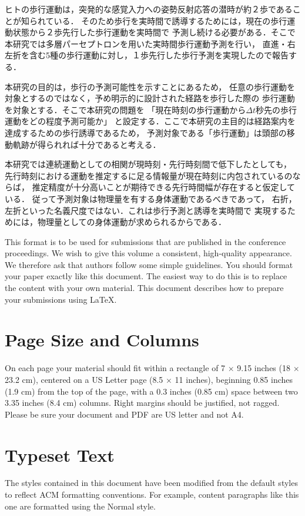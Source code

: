 \documentclass{sigchi}
\begin{document}

ヒトの歩行運動は，突発的な感覚入力への姿勢反射応答の潜時が約２歩であることが知られている\cite{bib01}．
そのため歩行を実時間で誘導するためには，現在の歩行運動状態から２歩先行した歩行運動を実時間で
予測し続ける必要がある．そこで本研究では多層パーセプトロンを用いた実時間歩行運動予測を行い，
直進・右左折を含む5種の歩行運動に対し，１歩先行した歩行予測を実現したので報告する．

本研究の目的は，歩行の予測可能性を示すことにあるため，
任意の歩行運動を対象とするのではなく，予め明示的に設計された経路を歩行した際の
歩行運動を対象とする．そこで本研究の問題を
「現在時刻の歩行運動から$\Delta t$秒先の歩行運動をどの程度予測可能か」
と設定する．ここで本研究の主目的は経路案内を達成するための歩行誘導であるため，
予測対象である「歩行運動」は頭部の移動軌跡が得られれば十分であると考える．

本研究では連続運動としての相関が現時刻・先行時刻間で低下したとしても，
先行時刻における運動を推定するに足る情報量が現在時刻に内包されているのならば，
推定精度が十分高いことが期待できる先行時間幅が存在すると仮定している．
従って予測対象は物理量を有する身体運動であるべきであって，
右折，左折といった名義尺度ではない．これは歩行予測と誘導を実時間で
実現するためには，物理量としての身体運動が求められるからである．

This format is to be used for submissions that are published in the
conference proceedings. We wish to give this volume a consistent,
high-quality appearance. We therefore ask that authors follow some
simple guidelines. You should format your paper exactly like this
document. The easiest way to do this is to replace the content with
your own material.  This document describes how to prepare your
submissions using \LaTeX.

\section{Page Size and Columns}
On each page your material should fit within a rectangle of 7 $\times$
9.15 inches (18 $\times$ 23.2 cm), centered on a US Letter page (8.5
$\times$ 11 inches), beginning 0.85 inches (1.9 cm) from the top of
the page, with a 0.3 inches (0.85 cm) space between two 3.35 inches
(8.4 cm) columns. Right margins should be justified, not
ragged. Please be sure your document and PDF are US letter and not A4.

\section{Typeset Text}
The styles contained in this document have been modified from the
default styles to reflect ACM formatting conventions. For example,
content paragraphs like this one are formatted using the Normal style.
\end{document}
